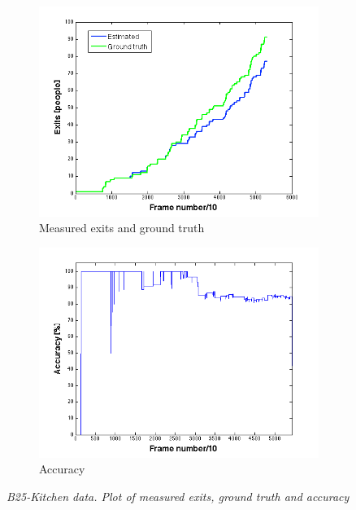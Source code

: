 \begin{figure}[H]
\centering
\begin{subfigure}{.5\textwidth}
  \centering
  \includegraphics[width=1.1\linewidth]{images/ExitsEval.png}
  \caption{Measured exits and ground truth}
  \label{fig:sub1}
\end{subfigure}%
\begin{subfigure}{.5\textwidth}
  \centering
  \includegraphics[width=1.1\linewidth]{images/AccExitsEval.png}
  \caption{Accuracy}
  \label{fig:sub2}
\end{subfigure}
\caption[B25-kitchen exits]{\textit{B25-Kitchen data. Plot of measured exits, ground truth and accuracy}}
\label{fig:B25-kitchen exits}
\end{figure}

